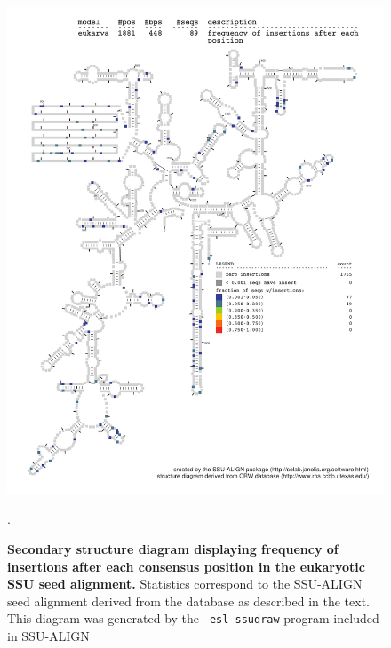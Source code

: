 \begin{figure}
\begin{center}
\includegraphics[width=5.7in]{Figures/eukarya-0p1-ifreq}
\end{center}
\caption[Secondary structure diagram displaying frequency of insertions
  after each consensus position in the eukaryotic SSU seed
  alignment]{\textbf{Secondary structure diagram displaying frequency
  of insertions after each consensus position in the eukaryotic SSU seed
  alignment.} Statistics correspond to the SSU-ALIGN seed
  alignment derived from the  database \cite{CannoneGutell02}
  as described in the text. This diagram was generated by the {\tt
  esl-ssudraw} program included in SSU-ALIGN}.
\label{fig:eukins}
\end{figure}


